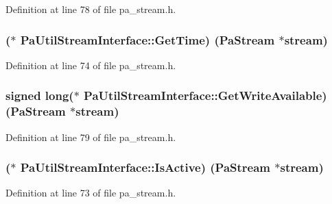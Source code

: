 Definition at line 78 of file pa\+\_\+stream.\+h.

\subsubsection[{\texorpdfstring{Get\+Time}{GetTime}}]{($\ast$ Pa\+Util\+Stream\+Interface\+::\+Get\+Time) ({\bf Pa\+Stream} $\ast$stream)}\hypertarget{struct_pa_util_stream_interface_a99d3c2b11e527653538915457f6ad002}{}\label{struct_pa_util_stream_interface_a99d3c2b11e527653538915457f6ad002}


Definition at line 74 of file pa\+\_\+stream.\+h.

\subsubsection[{\texorpdfstring{Get\+Write\+Available}{GetWriteAvailable}}]{\setlength{\rightskip}{0pt plus 5cm}signed long($\ast$ Pa\+Util\+Stream\+Interface\+::\+Get\+Write\+Available) ({\bf Pa\+Stream} $\ast$stream)}\hypertarget{struct_pa_util_stream_interface_ac448b65951cd4a62c0dd24d2f71f4c6e}{}\label{struct_pa_util_stream_interface_ac448b65951cd4a62c0dd24d2f71f4c6e}


Definition at line 79 of file pa\+\_\+stream.\+h.

\subsubsection[{\texorpdfstring{Is\+Active}{IsActive}}]{($\ast$ Pa\+Util\+Stream\+Interface\+::\+Is\+Active) ({\bf Pa\+Stream} $\ast$stream)}\hypertarget{struct_pa_util_stream_interface_a13997b0b1ff6809baca5b96f35c872eb}{}\label{struct_pa_util_stream_interface_a13997b0b1ff6809baca5b96f35c872eb}


Definition at line 73 of file pa\+\_\+stream.\+h.

